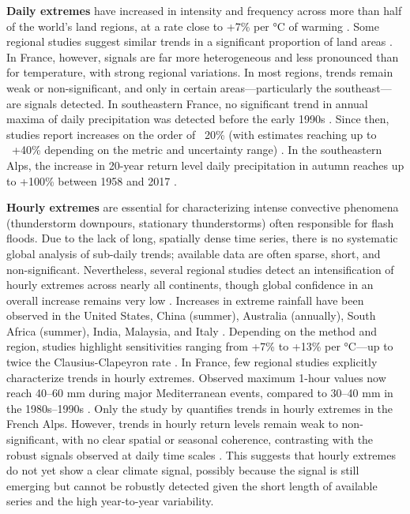\documentclass[french,a4paper,DIV=11,numbers=noendperiod]{scrartcl}
\begin{document}
\textbf{Daily extremes} have increased in intensity and
frequency across more than half of the world's land regions, at a rate
close to +7\% per °C of warming \parencite{IPCC2021}. Some regional studies
suggest similar trends in a significant proportion of land areas \parencite{Donat2016}. In France, however, signals are far more
heterogeneous and less pronounced than for temperature, with strong
regional variations. In most regions, trends remain weak or
non-significant, and only in certain areas---particularly the
southeast---are signals detected. In southeastern France, no significant trend in annual maxima of daily precipitation was detected before the early 1990s \parencite{blanchet-creutin-2022}. Since then, studies report increases on the order of ~20\% (with estimates reaching up to ~+40\% depending on the metric and uncertainty range) \parencite{Ribes2019,Blanchet2018,blanchet-creutin-2022}. In the southeastern Alps, the increase in 20-year return
level daily precipitation in autumn reaches up to +100\% between 1958 and 2017 \parencite{blanchet2021explaining}. 

\textbf{Hourly extremes} are
essential for characterizing intense convective phenomena (thunderstorm
downpours, stationary thunderstorms) often responsible for flash floods.
Due to the lack of long, spatially dense time series, there is no
systematic global analysis of sub-daily trends; available data are often
sparse, short, and non-significant. Nevertheless, several regional
studies detect an intensification of hourly extremes across nearly all
continents, though global confidence in an overall increase remains very
low \parencite{IPCC2021}. Increases in extreme rainfall have been observed in the
United States, China (summer), Australia (annually), South Africa
(summer), India, Malaysia, and Italy \parencite{IPCC2021}. Depending on the method and
region, studies highlight sensitivities ranging from +7\% to +13\% per
°C---up to twice the Clausius-Clapeyron rate \parencite{molnar2015relation}. In
France, few regional studies explicitly characterize trends in
hourly extremes. Observed maximum 1-hour values now reach 40--60 mm
during major Mediterranean events, compared to 30--40 mm in the
1980s--1990s \parencite{meteofrance2024}. Only the study by \cite{Berghald2025} quantifies trends in hourly extremes in the French Alps.
However, trends in hourly return levels remain weak to non-significant,
with no clear spatial or seasonal coherence, contrasting with the robust
signals observed at daily time scales \parencite{Soubeyroux01022015}. This suggests that hourly extremes do not yet show a clear climate signal, possibly because the signal is still emerging but cannot be robustly detected given the short length of available series and the high year-to-year variability.
\end{document}
